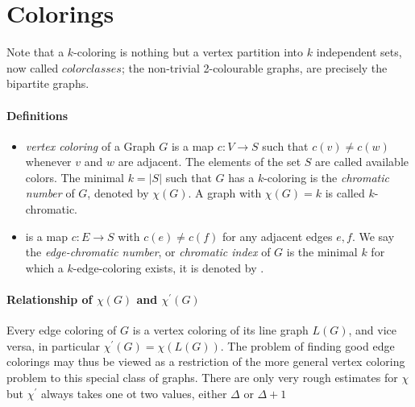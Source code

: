 \section{Colorings}
Note that a $k$-coloring is nothing but a vertex partition into 
$k$ independent sets, now called $ color classes$; the non-trivial
2-colourable graphs, are precisely the bipartite graphs.

\paragraph{Definitions}
\begin{itemize}
    \item \textit{vertex coloring} of a Graph $ G $ is a map 
    $c: V \to S $ such that $ c(v) \neq c(w) $ whenever $ v $ and 
    $ w $ are adjacent. The elements of the set $ S $ are called 
    available colors. The minimal $ k = |S| $ such that $ G $ has a
    $k$-coloring is the \textit{chromatic number} of $ G $, denoted 
    by $ \chi(G) $. A graph with $ \chi(G) = k $ is called $k$-chromatic.
    \item {} is a map $c: E \to S $ with $ c(e) \neq c(f) $
    for any adjacent edges $ e,f $. We say the \textit{edge-chromatic number},
    or \textit{chromatic index} of $ G $ is the minimal $ k $ for which 
    a $k$-edge-coloring exists, it is denoted by . 
\end{itemize}

\paragraph{Relationship of $\chi(G)$ and $\chi^\prime(G)$}
Every edge coloring of $ G $ is a vertex coloring of its line graph
$ L(G) $, and vice versa, in particular $ \chi^\prime(G) = \chi(L(G))$.
The problem of finding good edge colorings may thus be viewed as a 
restriction of the more general vertex coloring problem to this special 
class of graphs. There are only very rough estimates for $\chi$ but 
$\chi^\prime$ always takes one ot two values, either $ \Delta $ or 
$ \Delta + 1$